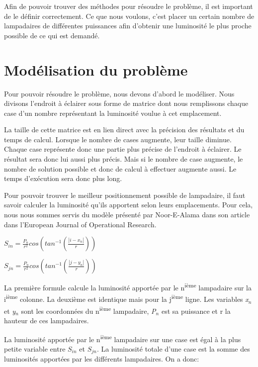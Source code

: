 Afin de pouvoir trouver des m\'{e}thodes pour r\'{e}soudre le probl\`{e}me, il est important de le d\'{e}finir correctement. Ce que nous voulons, c'est placer un certain nombre de lampadaires de différentes puissances afin d'obtenir une luminosit\'{e} le plus proche possible de ce qui est demand\'{e}.

\section{Mod\'{e}lisation du probl\`{e}me}
Pour pouvoir r\'{e}soudre le probl\`{e}me, nous devons d'abord le mod\'{e}liser.  Nous divisons l'endroit \`{a} \'{e}clairer sous forme de matrice dont nous remplissons chaque case d'un nombre repr\'{e}sentant la luminosit\'{e} voulue \`{a} cet emplacement.

La taille de cette matrice est en lien direct avec la pr\'{e}cision des r\'{e}sultats et du temps de calcul. Lorsque le nombre de cases augmente, leur taille diminue. Chaque case repr\'{e}sente donc une partie plus pr\'{e}cise de l'endroit \`{a} \'{e}clairer. Le r\'{e}sultat sera donc lui aussi plus pr\'{e}cis. Mais si le nombre de case augmente, le nombre de solution possible et donc de calcul \`{a} effectuer augmente aussi. Le temps d'ex\'{e}cution sera donc plus long.

Pour pouvoir trouver le meilleur positionnement possible de lampadaire, il faut savoir calculer la luminosité qu'ils apportent selon leurs emplacements. Pour cela, nous nous sommes servis du modèle présenté par Noor-E-Alama dans son article dans l'European Journal of Operational Research.

$
S_{in}=\frac{P_{n}}{r^{2}} cos \left (tan^{-1}\left (\frac{\left |i-x_{n}  \right |}{r}  \right )   \right )
$


$
S_{jn}=\frac{P_{n}}{r^{2}} cos \left (tan^{-1}\left (\frac{\left |j-y_{n}  \right |}{r}  \right )   \right )
$

La première formule calcule la luminosité apportée par le n\textsuperscript{ième} lampadaire sur la i\textsuperscript{ième} colonne. La deuxième est identique mais pour la j\textsuperscript{ième} ligne. Les variables \textit{x}$_{n}$ et \textit{y}$_{n}$ sont les coordonnées du n\textsuperscript{ième} lampadaire, \textit{P}$_{n}$ est sa puissance et r la hauteur de ces lampadaires.

La luminosité apportée par le n\textsuperscript{ième} lampadaire sur une case est égal à la plus petite variable entre $S_{in}$ et $S_{jn}$.
La luminosité totale d'une case est la somme des luminosités apportées par les différents lampadaires.
On a donc:

